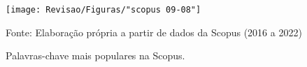 \begin{figure}[htp!]
	\centering
	\caption{Palavras-chave mais populares na Scopus.}
	\label{fig:scopus-09-08}
	\texttt{[image: Revisao/Figuras/"scopus 09-08"]}
	
	\vspace{0.2cm}
	Fonte: Elaboração própria a partir de dados da Scopus (2016 a 2022)
\end{figure}